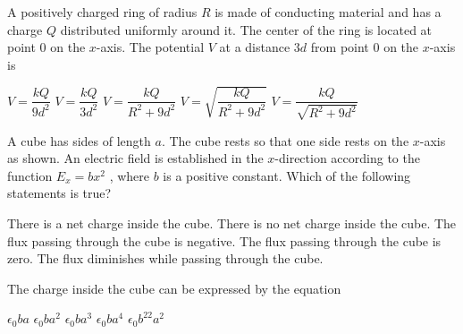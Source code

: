 \documentclass{../../../oss-classkick-exam}
\begin{document}
\begin{multicols*}{2}
\begin{questions}
   \question A positively charged ring of radius $R$ is made of conducting
   material and has a charge $Q$ distributed uniformly around it. The center of
   the ring is located at point $0$ on the $x$-axis. The potential $V$ at a
   distance $3d$ from point $0$ on the $x$-axis is
   \begin{center}
   \end{center}
   \begin{choices}
     \choice $V=\dfrac{kQ}{9d^2}$
     \choice $V=\dfrac{kQ}{3d^2}$
     \choice $V=\dfrac{kQ}{R^2+9d^2}$
     \choice $V=\sqrt{\dfrac{kQ}{R^2+9d^2}}$
     \choice $V=\dfrac{kQ}{\sqrt{R^2+9d^2}}$
   \end{choices}
   \vspace{.7in}
   
   \question A cube has sides of length $a$. The cube rests so that one side
   rests on the $x$-axis as shown. An electric field is established in the
   $x$-direction according to the function $E_x=bx^2$ , where $b$ is a positive
   constant. Which of the following statements is true?
   \label{cube1}
   \begin{choices}
     \choice There is a net charge inside the cube.
     \choice There is no net charge inside the cube.
     \choice The flux passing through the cube is negative.
     \choice The flux passing through the cube is zero.
     \choice The flux diminishes while passing through the cube.
   \end{choices}
   \vspace{.7in}
   
   \question The charge inside the cube can be expressed by the equation
   \label{cube2}
   \begin{choices}
     \choice $\epsilon_0ba$
     \choice $\epsilon_0ba^2$
     \choice $\epsilon_0ba^3$
     \choice $\epsilon_0ba^4$
     \choice $\epsilon_0b^22a^2$
   \end{choices}
   \columnbreak
   

\end{questions}
\end{multicols*}
\end{document}
